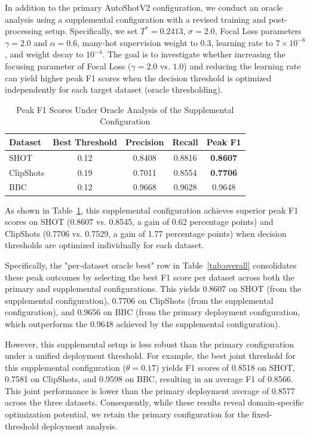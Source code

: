 In addition to the primary AutoShotV2 configuration, we conduct an oracle analysis using a supplemental configuration with a revised training and post-processing setup. Specifically, we set $T^* = 0.2413$, $\sigma = 2.0$, Focal Loss parameters $\gamma = 2.0$ and $\alpha = 0.6$, many-hot supervision weight to $0.3$, learning rate to $7 \times 10^{-6}$, and weight decay to $10^{-4}$. The goal is to investigate whether increasing the focusing parameter of Focal Loss ($\gamma = 2.0$ vs. $1.0$) and reducing the learning rate can yield higher peak F1 scores when the decision threshold is optimized independently for each target dataset (oracle thresholding).

\begin{table}[!t]
\caption{Peak F1 Scores Under Oracle Analysis of the Supplemental Configuration}
\label{tab:extra_sweep_peaks}
\centering
\small
\renewcommand{\arraystretch}{1.08}
\begin{tabular}{lcccc}
\toprule
\textbf{Dataset} & \textbf{Best Threshold} & \textbf{Precision} & \textbf{Recall} & \textbf{Peak F1} \\
\midrule
SHOT & 0.12 & 0.8408 & 0.8816 & \textbf{0.8607} \\
ClipShots & 0.19 & 0.7011 & 0.8554 & \textbf{0.7706} \\
BBC & 0.12 & 0.9668 & 0.9628 & 0.9648 \\
\bottomrule
\end{tabular}
\end{table}

As shown in Table~\ref{tab:extra_sweep_peaks}, this supplemental configuration achieves superior peak F1 scores on SHOT (0.8607 vs. 0.8545, a gain of 0.62 percentage points) and ClipShots (0.7706 vs. 0.7529, a gain of 1.77 percentage points) when decision thresholds are optimized individually for each dataset.

Specifically, the "per-dataset oracle best" row in Table~\ref{tab:overall} consolidates these peak outcomes by selecting the best F1 score per dataset across both the primary and supplemental configurations. This yields 0.8607 on SHOT (from the supplemental configuration), 0.7706 on ClipShots (from the supplemental configuration), and 0.9656 on BBC (from the primary deployment configuration, which outperforms the 0.9648 achieved by the supplemental configuration).

However, this supplemental setup is less robust than the primary configuration under a unified deployment threshold. For example, the best joint threshold for this supplemental configuration ($\theta = 0.17$) yields F1 scores of 0.8518 on SHOT, 0.7581 on ClipShots, and 0.9598 on BBC, resulting in an average F1 of 0.8566. This joint performance is lower than the primary deployment average of 0.8577 across the three datasets. Consequently, while these results reveal domain-specific optimization potential, we retain the primary configuration for the fixed-threshold deployment analysis.

